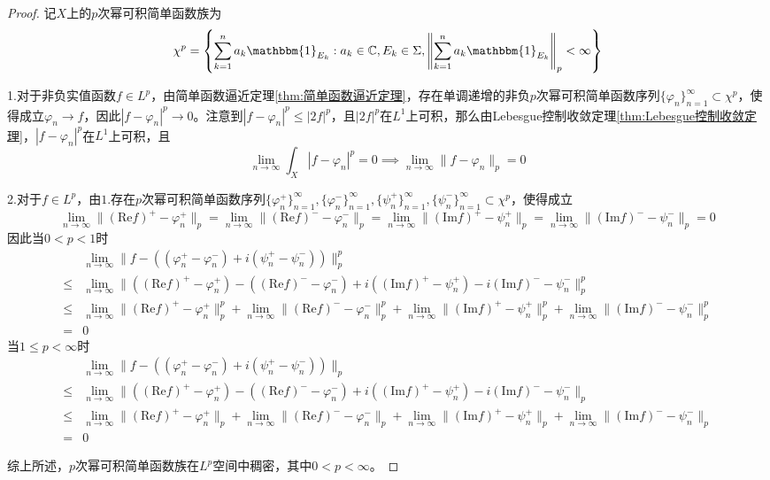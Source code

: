 \documentclass[lang = cn, scheme = chinese, thmcnt = section]{elegantbook}
\newcommand{\C}{\mathbb{C}}  		   %
\begin{document}
\begin{proof}
	记$X$上的$p$次幂可积简单函数族为
	$$
	\chi^p=\left\{ \sum_{k=1}^{n}a_k\mathbbm{1}_{E_k}:a_k\in\C,E_k\in \Sigma,\left\| \sum_{k=1}^{n}a_k\mathbbm{1}_{E_k} \right\|_p<\infty \right\}
	$$
	
	1.对于非负实值函数$f\in L^p$，由简单函数逼近定理\ref{thm:简单函数逼近定理}，存在单调递增的非负$p$次幂可积简单函数序列$\{ \varphi_n \}_{n=1}^{\infty}\subset \chi^p$，使得成立$\varphi_n\to f$，因此$\left|f-\varphi_n\right|^p\to0$。注意到$\left|f-\varphi_n\right|^p\le \left|2f\right|^p$，且$\left|2f\right|^p$在$L^1$上可积，那么由Lebesgue控制收敛定理\ref{thm:Lebesgue控制收敛定理}，$\left|f-\varphi_n\right|^p$在$L^1$上可积，且
	$$
	\lim_{n\to\infty}\int_X \left|f-\varphi_n\right|^p=0
	\implies \lim_{n\to\infty}\|f-\varphi_n\|_p=0
	$$
	
	2.对于$f\in L^p$，由$1.$存在$p$次幂可积简单函数序列$\{ \varphi_n^+ \}_{n=1}^{\infty},\{ \varphi_n^- \}_{n=1}^{\infty},\{ \psi_n^+ \}_{n=1}^{\infty},\{ \psi_n^- \}_{n=1}^{\infty}\subset \chi^p$，使得成立
	$$
	\lim_{n\to\infty}\|(\text{Re} f)^+-\varphi_n^+\|_p
	=\lim_{n\to\infty}\|(\text{Re} f)^--\varphi_n^-\|_p
	=\lim_{n\to\infty}\|(\text{Im} f)^+-\psi_n^+\|_p
	=\lim_{n\to\infty}\|(\text{Im} f)^--\psi_n^-\|_p=0
	$$
	因此当$0<p<1$时
	\nonumber\begin{align}
		&\lim_{n\to\infty}\| f-((\varphi_n^+-\varphi_n^-)+i(\psi_n^+-\psi_n^-)) \|_p^p\\
		\le & \lim_{n\to\infty}\| ((\text{Re} f)^+-\varphi_n^+)-((\text{Re} f)^--\varphi_n^-)+i((\text{Im} f)^+-\psi_n^+)-i(\text{Im} f)^--\psi_n^- \|_p^p\\
		\le & \lim_{n\to\infty}\|(\text{Re} f)^+-\varphi_n^+\|_p^p+\lim_{n\to\infty}\|(\text{Re} f)^--\varphi_n^-\|_p^p+\lim_{n\to\infty}\|(\text{Im} f)^+-\psi_n^+\|_p^p+\lim_{n\to\infty}\|(\text{Im} f)^--\psi_n^-\|_p^p\\
		=&0
	\end{align}
	当$1\le p<\infty$时
	\nonumber\begin{align}
		&\lim_{n\to\infty}\| f-((\varphi_n^+-\varphi_n^-)+i(\psi_n^+-\psi_n^-)) \|_p\\
		\le & \lim_{n\to\infty}\| ((\text{Re} f)^+-\varphi_n^+)-((\text{Re} f)^--\varphi_n^-)+i((\text{Im} f)^+-\psi_n^+)-i(\text{Im} f)^--\psi_n^- \|_p\\
		\le & \lim_{n\to\infty}\|(\text{Re} f)^+-\varphi_n^+\|_p+\lim_{n\to\infty}\|(\text{Re} f)^--\varphi_n^-\|_p+\lim_{n\to\infty}\|(\text{Im} f)^+-\psi_n^+\|_p+\lim_{n\to\infty}\|(\text{Im} f)^--\psi_n^-\|_p\\
		=&0
	\end{align}
	
	综上所述，$p$次幂可积简单函数族在$L^p$空间中稠密，其中$0<p<\infty$。
\end{proof}
\end{document}
